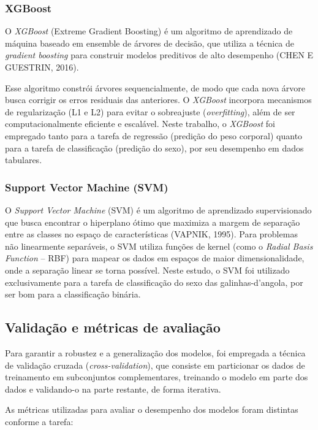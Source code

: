 \documentclass[12pt]{article}
\begin{document}
\subsubsection{XGBoost}

O \textit{XGBoost} (Extreme Gradient Boosting) é um algoritmo de aprendizado de
máquina baseado em ensemble de árvores de decisão, que utiliza a técnica de
\textit{gradient boosting} para construir modelos preditivos de alto desempenho
(CHEN E GUESTRIN, 2016).

Esse algoritmo constrói árvores sequencialmente, de modo que cada nova árvore
busca corrigir os erros residuais das anteriores. O \textit{XGBoost} incorpora
mecanismos de regularização (L1 e L2) para evitar o sobreajuste
(\textit{overfitting}), além de ser computacionalmente eficiente e escalável.
Neste trabalho, o \textit{XGBoost} foi empregado tanto para a tarefa de
regressão (predição do peso corporal) quanto para a tarefa de classificação
(predição do sexo), por seu desempenho em dados tabulares.

\subsubsection{Support Vector Machine (SVM)}

O \textit{Support Vector Machine} (SVM) é um algoritmo de aprendizado
supervisionado que busca encontrar o hiperplano ótimo que maximiza a margem de
separação entre as classes no espaço de características (VAPNIK, 1995). Para
problemas não linearmente separáveis, o SVM utiliza funções de kernel (como o
\textit{Radial Basis Function} -- RBF) para mapear os dados em espaços de maior
dimensionalidade, onde a separação linear se torna possível. Neste estudo, o
SVM foi utilizado exclusivamente para a tarefa de classificação do sexo das
galinhas-d'angola, por ser bom para a classificação binária.

\subsection{Validação e métricas de avaliação}

Para garantir a robustez e a generalização dos modelos, foi empregada a técnica
de validação cruzada (\textit{cross-validation}), que consiste em particionar
os dados de treinamento em subconjuntos complementares, treinando o modelo em
parte dos dados e validando-o na parte restante, de forma iterativa.

As métricas utilizadas para avaliar o desempenho dos modelos foram distintas
conforme a tarefa:
\end{document}
